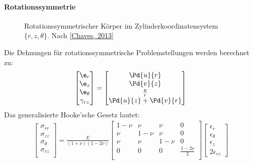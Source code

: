 \documentclass[letterpaper,10pt,german]{jupyterBook}
\let\sphinxpxdimen\pdfpxdimen\else\newdimen\sphinxpxdimen
\begin{document}
\paragraph{Rotationssymmetrie}
\label{\detokenize{chapters/chapter1/elasticity:rotationssymmetrie}}
\begin{figure}[htbp]
\centering
\capstart

\noindent\sphinxincludegraphics[height=300\sphinxpxdimen]{{Rotsym}.png}
\caption{Rotationssymmetrischer Körper im Zylinderkoordinatensystem \(\{r,z,\theta\}\). Nach {[}\hyperlink{cite.quellen:id10}{Chaves, 2013}{]}}\label{\detokenize{chapters/chapter1/elasticity:rotsym}}\end{figure}

\sphinxAtStartPar
Die Dehnungen für rotationssymmetrische Problemstellungen werden berechnet zu:
\begin{equation}\label{equation:chapters/chapter1/elasticity:rotsymstrain}
\begin{split}\begin{bmatrix}
\e_{r} \\
\e_z \\
\e_{\theta} \\
\gamma_{rz}
\end{bmatrix} = \begin{bmatrix}
\Pd{u}{r} \\
\Pd{v}{z} \\
\frac{u}{r} \\
\Pd{u}{z} + \Pd{v}{r}
\end{bmatrix} \end{split}
\end{equation}
\sphinxAtStartPar
Das generalisierte Hooke’sche Gesetz lautet:
\begin{equation}\label{equation:chapters/chapter1/elasticity:generalHookRotsym}
\begin{split}\begin{bmatrix} 
\sigma_{rr} \\
\sigma_{zz} \\
\sigma_{\theta} \\
\sigma_{rz} \\
\end{bmatrix} = \frac{E}{(1+\nu)(1-2\nu)}\begin{bmatrix}
1-\nu & \nu & \nu & 0  \\
\nu & 1-\nu & \nu & 0  \\
\nu & \nu & 1-\nu & 0  \\
0 & 0 & 0 & \frac{1-2\nu}{2} \\
\end{bmatrix} \begin{bmatrix} \epsilon_{r} \\ \epsilon_{\theta} \\ \epsilon_{z} \\ 2\epsilon_{rz}  \end{bmatrix}\end{split}
\end{equation}
\end{document}
